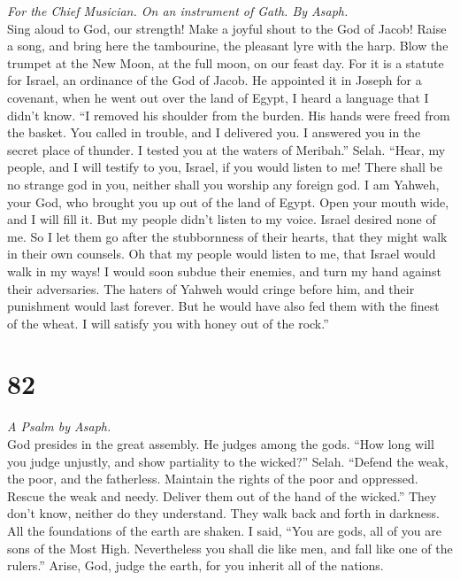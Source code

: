 \emph{For the Chief Musician. On an instrument of Gath. By Asaph.}\\
 Sing aloud to God, our strength! Make a joyful shout to
the God of Jacob!  Raise a song, and bring here the
tambourine, the pleasant lyre with the harp.  Blow the
trumpet at the New Moon, at the full moon, on our feast day.
 For it is a statute for Israel, an ordinance of the God
of Jacob.  He appointed it in Joseph for a covenant, when
he went out over the land of Egypt, I heard a language that I didn't
know.  ``I removed his shoulder from the burden. His hands
were freed from the basket.  You called in trouble, and I
delivered you. I answered you in the secret place of thunder. I tested
you at the waters of Meribah.'' Selah.  ``Hear, my people,
and I will testify to you, Israel, if you would listen to me!
 There shall be no strange god in you, neither shall you
worship any foreign god.  I am Yahweh, your God, who
brought you up out of the land of Egypt. Open your mouth wide, and I
will fill it.  But my people didn't listen to my voice.
Israel desired none of me.  So I let them go after the
stubbornness of their hearts, that they might walk in their own
counsels.  Oh that my people would listen to me, that
Israel would walk in my ways!  I would soon subdue their
enemies, and turn my hand against their adversaries.  The
haters of Yahweh would cringe before him, and their punishment would
last forever.  But he would have also fed them with the
finest of the wheat. I will satisfy you with honey out of the rock.''

\hypertarget{section-81}{%
\section{82}\label{section-81}}

\emph{A Psalm by Asaph.}\\
 God presides in the great assembly. He judges among the
gods.  ``How long will you judge unjustly, and show
partiality to the wicked?'' Selah.  ``Defend the weak, the
poor, and the fatherless. Maintain the rights of the poor and oppressed.
 Rescue the weak and needy. Deliver them out of the hand
of the wicked.''  They don't know, neither do they
understand. They walk back and forth in darkness. All the foundations of
the earth are shaken.  I said, ``You are gods, all of you
are sons of the Most High.  Nevertheless you shall die
like men, and fall like one of the rulers.''  Arise, God,
judge the earth, for you inherit all of the nations.

